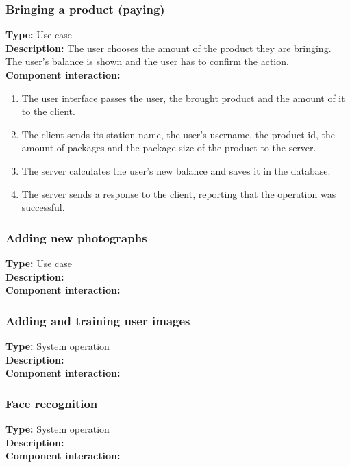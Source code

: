 \documentclass[11pt]{article}
\begin{document}
\subsubsection{Bringing a product (paying)}
\textbf{Type:} Use case\\
\textbf{Description:} The user chooses the amount of the product they are bringing. 
The user's balance is shown and the user has to confirm the action.\\
\textbf{Component interaction:}
\begin{enumerate} 
\item{The user interface passes the user, the brought product and the amount of it to the client.}
\item{The client sends its station name, the user's username, the product id, the amount of packages and the package size of the product to the server.}
\item{The server calculates the user's new balance and saves it in the database.}
\item{The server sends a response to the client, reporting that the operation was successful.}
\end{enumerate}

\subsubsection{Adding new photographs}
\textbf{Type:} Use case\\
\textbf{Description:}\\
\textbf{Component interaction:}\\

\subsubsection{Adding and training user images}
\label{sec:add-train}
\textbf{Type:} System operation\\
\textbf{Description:}\\
\textbf{Component interaction:}\\

\subsubsection{Face recognition}
\textbf{Type:} System operation\\
\textbf{Description:}\\
\textbf{Component interaction:}\\
\end{document}
